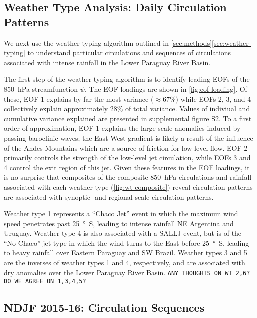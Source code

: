 \documentclass[twocol]{ametsoc}
\begin{document}
\subsection{Weather Type Analysis: Daily Circulation Patterns} \label{sec:weather-types}

We next use the weather typing algorithm outlined in \cref{sec:methods}\ref{sec:weather-typing} to understand particular circulations and sequences of circulations associated with intense rainfall in the Lower Paraguay River Basin.

The first step of the weather typing algorithm is to identify leading EOFs of the \SI{850}{\hecto\pascal} streamfunction $\psi$.
The EOF loadings are shown in \cref{fig:eof-loading}.
Of these, EOF 1 explains by far the most variance ($\approx 67\%$) while EOFs 2, 3, and 4 collectively explain approximately $28\%$ of total variance. Values of indiviual and cumulative variance explained are presented in supplemental figure S2.
To a first order of approximation, EOF 1 explains the large-scale anomalies induced by passing baroclinic waves; the East-West gradient is likely a result of the influence of the Andes Mountains which are a source of friction for low-level flow.
EOF 2 primarily controls the strength of the low-level jet circulation, while EOFs 3 and 4 control the exit region of this jet.
Given these features in the EOF loadings, it is no surprise that composites of the composite \SI{850}{\hecto\pascal} circulations and rainfall associated with each weather type (\cref{fig:wt-composite}) reveal circulation patterns are associated with synoptic- and regional-scale circulation patterns.

Weather type 1 represents a ``Chaco Jet'' event \citep{Salio:2002ev} in which the maximum wind speed penetrates past \SI{25}{\degree S}, leading to intense rainfall NE Argentina and Uruguay.
Weather type 4 is also associated with a SALLJ event, but is of the ``No-Chaco'' jet type in which the wind turns to the East before \SI{25}{\degree S}, leading to heavy rainfall over Eastern Paraguay and SW Brazil.
Weather types 3 and 5 are the inverses of weather types 1 and 4, respectively, and are associated with dry anomalies over the Lower Paraguay River Basin.
\texttt{ANY THOUGHTS ON WT 2,6? DO WE AGREE ON 1,3,4,5?}

\subsection{NDJF 2015-16: Circulation Sequences}
\end{document}
